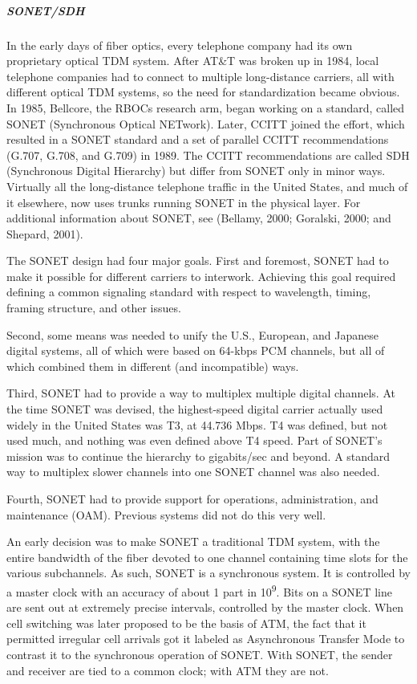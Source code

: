 \documentclass[b5paper,11pt]{memoir}
\begin{document}
\protect\hypertarget{0130661023_ch02lev1sec5.htmlux5cux23ch02lev3sec15}{}{}

\subparagraph{SONET/SDH}

In the early days of fiber optics, every telephone company had its own
proprietary optical TDM system. After AT\&T was broken up in 1984, local
telephone companies had to connect to multiple long-distance carriers,
all with different optical TDM systems, so the need for standardization
became obvious. In 1985, Bellcore, the RBOCs research arm, began working
on a standard, called {SONET} ({Synchronous Optical NETwork}). Later,
CCITT joined the effort, which resulted in a SONET standard and a set of
parallel CCITT recommendations (G.707, G.708, and G.709) in 1989. The
CCITT recommendations are called {SDH} ({Synchronous Digital Hierarchy})
but differ from SONET only in minor ways. Virtually all the
long-distance telephone traffic in the United States, and much of it
elsewhere, now uses trunks running SONET in the physical layer. For
additional information about SONET, see (Bellamy, 2000; Goralski, 2000;
and Shepard, 2001).

The SONET design had four major goals. First and foremost, SONET had to
make it possible for different carriers to interwork. Achieving this
goal required defining a common signaling standard with respect to
wavelength, timing, framing structure, and other issues.

Second, some means was needed to unify the U.S., European, and Japanese
digital systems, all of which were based on 64-kbps PCM channels, but
all of which combined them in different (and incompatible) ways.

Third, SONET had to provide a way to multiplex multiple digital
channels. At the time SONET was devised, the highest-speed digital
carrier actually used widely in the United States was T3, at 44.736
Mbps. T4 was defined, but not used much, and nothing was even defined
above T4 speed. Part of SONET's mission was to continue the hierarchy to
gigabits/sec and beyond. A standard way to multiplex slower channels
into one SONET channel was also needed.

Fourth, SONET had to provide support for operations, administration, and
maintenance (OAM). Previous systems did not do this very well.

An early decision was to make SONET a traditional TDM system, with the
entire bandwidth of the fiber devoted to one channel containing time
slots for the various subchannels. As such, SONET is a synchronous
system. It is controlled by a master clock with an accuracy of about 1
part in 10\textsuperscript{9}. Bits on a SONET line are sent out at
extremely precise intervals, controlled by the master clock. When cell
switching was later proposed to be the basis of ATM, the fact that it
permitted irregular cell arrivals got it labeled as {Asynchronous}
Transfer Mode to contrast it to the synchronous operation of SONET. With
SONET, the sender and receiver are tied to a common clock; with ATM they
are not.
\end{document}
